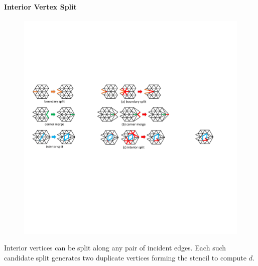 \paragraph{Interior Vertex Split}
\begin{figure}
  \begin{center}
  \vspace{-4mm}
    \includegraphics[width=1\linewidth]{fig/iSplit}
  \vspace{-1mm}
  \end{center}
\end{figure}
Interior vertices can be split along 
any pair of incident edges. Each such candidate split generates two duplicate vertices forming the stencil to compute $d$. 

